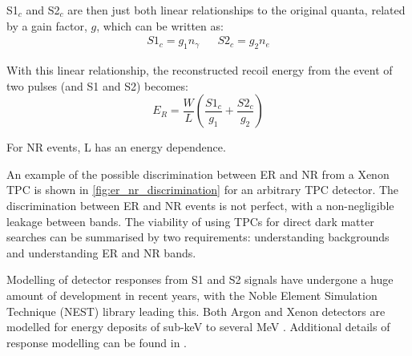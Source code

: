 \par
S1$_c$ and S2$_c$ are then just both linear relationships to the original quanta, related by a gain factor, $g$, which can be written as:
\begin{align}
    S1_c = g_1 n_\gamma && S2_c = g_2 n_e
\end{align}

\par
With this linear relationship, the reconstructed recoil energy from the event of two pulses (and S1 and S2) becomes:
\begin{equation}
    E_R = \frac{W}{L}(\frac{S1_c}{g_1} + \frac{S2_c}{g_2})
\end{equation}

For NR events, L has an energy dependence.
\par
An example of the possible discrimination between ER and NR from a Xenon TPC is shown in \autoref{fig:er_nr_discrimination} for an arbitrary TPC detector.
The discrimination between ER and NR events is not perfect, with a non-negligible leakage between bands.
The viability of using TPCs for direct dark matter searches can be summarised by two requirements: understanding backgrounds and understanding ER and NR bands.



\par
Modelling of detector responses from S1 and S2 signals have undergone a huge amount of development in recent years, with the Noble Element Simulation Technique (NEST) library leading this.
Both Argon and Xenon detectors are modelled for energy deposits of sub-keV to several MeV \cite{nest_1_ref}.
Additional details of response modelling can be found in \cite{gregrischbieter_thesis_ref, flamenest_ref}.
